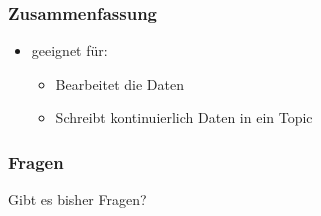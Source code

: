 \begin{frame}
\frametitle{Zusammenfassung}



\begin{itemize}
	\item geeignet für:
	\begin{itemize}
		\item Bearbeitet die Daten %
		\item Schreibt kontinuierlich Daten in ein Topic %
	\end{itemize}
\end{itemize}

\end{frame}

\begin{frame}
\frametitle{Fragen}
\begin{center}
\Large{Gibt es bisher Fragen?}
\end{center}
\end{frame}